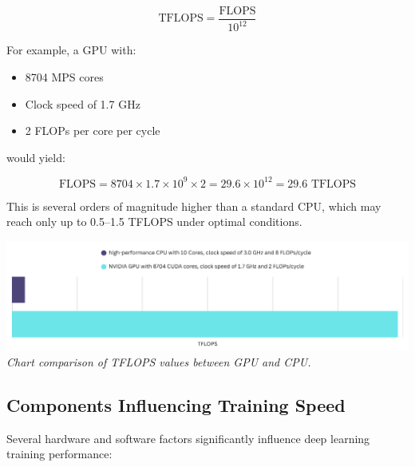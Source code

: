 \[
\text{TFLOPS} = \frac{\text{FLOPS}}{10^{12}}
\]

For example, a GPU with:
\begin{itemize}
    \item 8704 MPS cores
    \item Clock speed of 1.7 GHz
    \item 2 FLOPs per core per cycle
\end{itemize}

would yield:

\[
\text{FLOPS} = 8704 \times 1.7 \times 10^9 \times 2 = 29.6 \times 10^{12} = 29.6 \text{ TFLOPS}
\]

This is several orders of magnitude higher than a standard CPU, which may reach only up to 0.5–1.5 
TFLOPS under optimal conditions.

\vspace{1em} 
\begin{center} 
    \includegraphics[width=\textwidth]{../assets/07-results/tflops-cpu-vs-gpu.png} 
    \small\textit{Chart comparison of TFLOPS values between GPU and CPU.} 
\end{center}
\vspace{1em} 


\subsection{Components Influencing Training Speed}

Several hardware and software factors significantly influence deep learning training performance:

